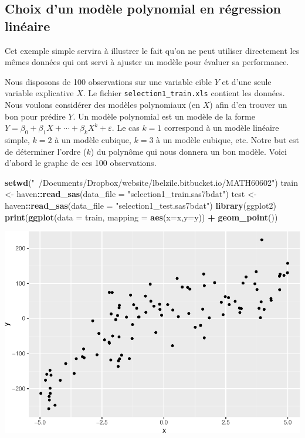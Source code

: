 \documentclass[
]{book}
\newenvironment{Shaded}{\begin{snugshade}}{\end{snugshade}}
\newcommand{\DataTypeTok}[1]{\textcolor[rgb]{0.13,0.29,0.53}{#1}}
\newcommand{\KeywordTok}[1]{\textcolor[rgb]{0.13,0.29,0.53}{\textbf{#1}}}
\newcommand{\NormalTok}[1]{#1}
\newcommand{\OperatorTok}[1]{\textcolor[rgb]{0.81,0.36,0.00}{\textbf{#1}}}
\newcommand{\StringTok}[1]{\textcolor[rgb]{0.31,0.60,0.02}{#1}}
\theoremstyle{definition}
\theoremstyle{definition}
\theoremstyle{definition}
\theoremstyle{remark}
\begin{document}
\hypertarget{choix-dun-moduxe8le-polynomial-en-ruxe9gression-linuxe9aire}{%
\subsection{Choix d'un modèle polynomial en régression linéaire}\label{choix-dun-moduxe8le-polynomial-en-ruxe9gression-linuxe9aire}}

Cet exemple simple servira à illustrer le fait qu'on ne peut utiliser directement les mêmes données qui ont servi à ajuster un modèle pour évaluer sa performance.

Nous disposons de 100 observations sur une variable cible \(Y\) et d'une seule variable explicative \(X\). Le fichier \texttt{selection1\_train.xls} contient les données. Nous voulons considérer des modèles polynomiaux (en \(X\)) afin d'en trouver un bon pour prédire \(Y\). Un modèle polynomial est un modèle de la forme \(Y=\beta_0 + \beta_1X+\cdots+\beta_kX^k+\varepsilon\). Le cas \(k=1\) correspond à un modèle linéaire simple, \(k=2\) à un modèle cubique, \(k=3\) à un modèle cubique, etc. Notre but est de déterminer l'ordre (\(k\)) du polynôme qui nous donnera un bon modèle. Voici d'abord le graphe de ces 100 observations.

\begin{Shaded}
\begin{Highlighting}[]
\KeywordTok{setwd}\NormalTok{(}\StringTok{"~/Documents/Dropbox/website/lbelzile.bitbucket.io/MATH60602"}\NormalTok{)}
\NormalTok{train <-}\StringTok{ }\NormalTok{haven}\OperatorTok{::}\KeywordTok{read_sas}\NormalTok{(}\DataTypeTok{data_file =} \StringTok{"selection1_train.sas7bdat"}\NormalTok{)}
\NormalTok{test <-}\StringTok{ }\NormalTok{haven}\OperatorTok{::}\KeywordTok{read_sas}\NormalTok{(}\DataTypeTok{data_file =} \StringTok{"selection1_test.sas7bdat"}\NormalTok{)}
\KeywordTok{library}\NormalTok{(ggplot2)}
\KeywordTok{print}\NormalTok{(}\KeywordTok{ggplot}\NormalTok{(}\DataTypeTok{data =}\NormalTok{ train, }\DataTypeTok{mapping =} \KeywordTok{aes}\NormalTok{(}\DataTypeTok{x=}\NormalTok{x,}\DataTypeTok{y=}\NormalTok{y)) }\OperatorTok{+}\StringTok{ }\KeywordTok{geom_point}\NormalTok{())}
\end{Highlighting}
\end{Shaded}

\includegraphics{MATH60602_files/figure-latex/02-graphedonneestest-1.pdf}
\end{document}
